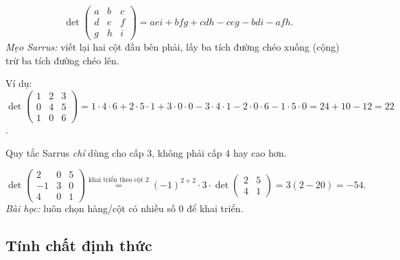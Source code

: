 \documentclass[12pt,a4paper]{article}
\begin{document}
\begin{vidu}[title={Định thức cấp 3 -- Quy tắc Sarrus}]
\[
  \det\begin{pmatrix}a & b & c\\ d & e & f\\ g & h & i\end{pmatrix} = aei + bfg + cdh - ceg - bdi - afh.
\]
\emph{Mẹo Sarrus:} viết lại hai cột đầu bên phải, lấy ba tích đường chéo xuống (cộng) trừ ba tích đường chéo lên.

Ví dụ: $\det\begin{pmatrix}1&2&3\\0&4&5\\1&0&6\end{pmatrix} = 1\cdot 4\cdot 6 + 2\cdot 5\cdot 1 + 3\cdot 0\cdot 0 - 3\cdot 4\cdot 1 - 2\cdot 0\cdot 6 - 1\cdot 5\cdot 0 = 24 + 10 - 12 = 22$.
\end{vidu}

\begin{luuy}
Quy tắc Sarrus \emph{chỉ} dùng cho cấp 3, không phải cấp 4 hay cao hơn.
\end{luuy}

\begin{vidu}[title={Khai triển theo hàng có nhiều số 0}]
\[
  \det\begin{pmatrix}2 & 0 & 5\\ -1 & 3 & 0\\ 4 & 0 & 1\end{pmatrix} \stackrel{\text{khai triển theo cột 2}}{=} (-1)^{2+2}\cdot 3 \cdot \det\begin{pmatrix}2 & 5\\ 4 & 1\end{pmatrix} = 3(2 - 20) = -54.
\]
\emph{Bài học:} luôn chọn hàng/cột có nhiều số 0 để khai triển.
\end{vidu}

\subsection{Tính chất định thức}
\end{document}

